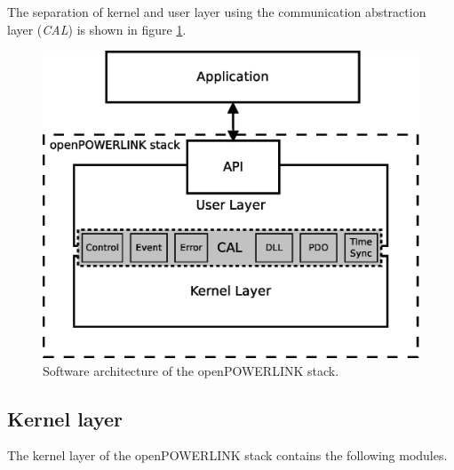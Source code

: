 The separation of kernel and user layer using the communication abstraction layer (\emph{CAL}) is shown in figure \ref{fig:openpowerlink_arch}.

\begin{figure}
\centering
\includegraphics[width=0.9\linewidth]{images/openpowerlink_arch}
\caption{Software architecture of the openPOWERLINK stack.}
\label{fig:openpowerlink_arch}
\end{figure}


\subsection{Kernel layer}
\label{sec:oplk_architecture_kernel}

The kernel layer of the openPOWERLINK stack contains the following modules. \cite[openPOWERLINK Kernel Layer]{openpowerlink_doc}

